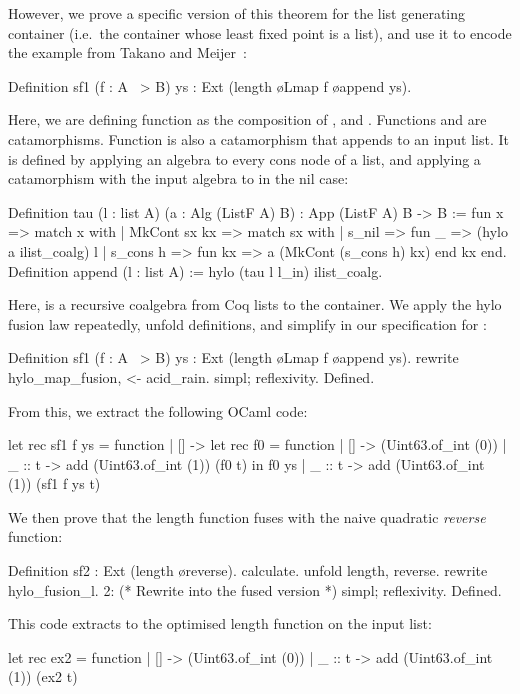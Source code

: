 \documentclass[ a4paper, UKenglish, cleveref, autoref, thm-restate]{lipics-v2021}
\begin{document}
However, we prove a specific version of this theorem for the list generating
container (i.e.\ the container whose least fixed point is a list), and use it
to encode the example from Takano and Meijer~\cite{TakanoM95}:
\begin{coqcode}
Definition sf1 (f : A ~> B) ys : Ext (length \o Lmap f \o append ys).
\end{coqcode}
Here, we are defining function  as the composition of ,
 and . Functions  and  are
catamorphisms. Function  is also a catamorphism that
appends  to an input list. It is defined by applying an algebra to
every cons node of a list, and applying a catamorphism with the input algebra
to  in the nil case:
\begin{coqcode}
Definition tau (l : list A) (a : Alg (ListF A) B) : App (ListF A) B -> B :=
  fun x => match x with | MkCont sx kx => match sx with
  | s_nil => fun _ => (hylo a ilist_coalg) l
  | s_cons h => fun kx => a (MkCont (s_cons h) kx)
  end kx end.
Definition append (l : list A) := hylo (tau l l_in) ilist_coalg.
\end{coqcode}
Here,  is a recursive coalgebra from Coq lists to the
 container. We apply the hylo fusion law repeatedly, unfold
definitions, and simplify in our specification for :
\begin{coqcode}
Definition sf1 (f : A ~> B) ys : Ext (length \o Lmap f \o append ys).
  rewrite hylo_map_fusion, <- acid_rain.
  simpl; reflexivity.
Defined.
\end{coqcode}
From this, we extract the following OCaml code:
\begin{ocamlcode}
let rec sf1 f ys = function | [] -> let rec f0 = function
                                      | [] -> (Uint63.of_int (0))
                                      | _ :: t -> add (Uint63.of_int (1)) (f0 t)
                                    in f0 ys
                            | _ :: t -> add (Uint63.of_int (1)) (sf1 f ys t)
\end{ocamlcode}

We then prove that the length function fuses with
the naive quadratic \emph{reverse} function:
\begin{coqcode}
Definition sf2 : Ext (length \o reverse).
  calculate.  unfold length, reverse. rewrite hylo_fusion_l.
  2:{ (* Rewrite into the fused version *) }
  simpl; reflexivity.
Defined.
\end{coqcode}
This code extracts to the optimised length function on the input list:
\begin{ocamlcode}
let rec ex2 = function | [] -> (Uint63.of_int (0))
                       | _ :: t -> add (Uint63.of_int (1)) (ex2 t)
\end{ocamlcode}
\end{document}
